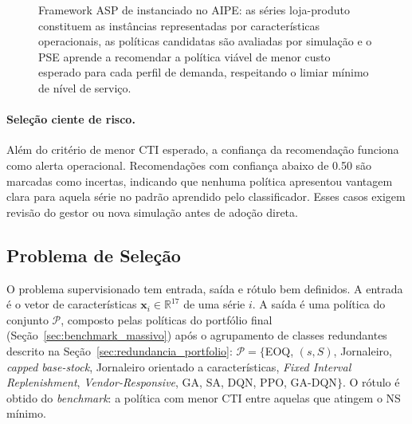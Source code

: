 \begin{figure}[htbp]
\centering
{}
\caption{Framework ASP de \citet{Rice1976AlgorithmSelection} instanciado no AIPE: as séries loja-produto constituem as instâncias representadas por características operacionais, as políticas candidatas são avaliadas por simulação e o PSE aprende a recomendar a política viável de menor custo esperado para cada perfil de demanda, respeitando o limiar mínimo de nível de serviço.}
\label{fig:asp_rice}
\end{figure}

\paragraph{Seleção ciente de risco.} Além do critério de menor CTI esperado, a confiança da recomendação funciona como alerta operacional. Recomendações com confiança abaixo de 0.50 são marcadas como incertas, indicando que nenhuma política apresentou vantagem clara para aquela série no padrão aprendido pelo classificador. Esses casos exigem revisão do gestor ou nova simulação antes de adoção direta.

\subsection{Problema de Seleção}

O problema supervisionado tem entrada, saída e rótulo bem definidos. A entrada é o vetor de características $\mathbf{x}_i \in \mathbb{R}^{17}$ de uma série $i$. A saída é uma política do conjunto $\mathcal{P}$, composto pelas políticas do portfólio final (Seção~\ref{sec:benchmark_massivo}) após o agrupamento de classes redundantes descrito na Seção~\ref{sec:redundancia_portfolio}: $\mathcal{P} = \{$EOQ, $(s,S)$, Jornaleiro, \textit{capped base-stock}, Jornaleiro orientado a características, \textit{Fixed Interval Replenishment}, \textit{Vendor-Responsive}, GA, SA, DQN, PPO, GA-DQN$\}$. O rótulo é obtido do \textit{benchmark}: a política com menor CTI entre aquelas que atingem o NS mínimo.

